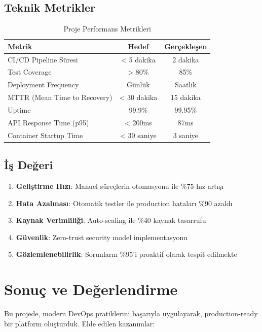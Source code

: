 \documentclass[12pt,a4paper]{article}
\begin{document}
\subsection{Teknik Metrikler}

\begin{table}[H]
\centering
\begin{tabular}{@{}lcc@{}}
\toprule
\textbf{Metrik} & \textbf{Hedef} & \textbf{Gerçekleşen} \\
\midrule
CI/CD Pipeline Süresi & < 5 dakika & 2 dakika \\
Test Coverage & > 80\% & 85\% \\
Deployment Frequency & Günlük & Saatlik \\
MTTR (Mean Time to Recovery) & < 30 dakika & 15 dakika \\
Uptime & 99.9\% & 99.95\% \\
API Response Time (p95) & < 200ms & 87ms \\
Container Startup Time & < 30 saniye & 3 saniye \\
\bottomrule
\end{tabular}
\caption{Proje Performans Metrikleri}
\end{table}

\subsection{İş Değeri}

\begin{enumerate}
    \item \textbf{Geliştirme Hızı}: Manuel süreçlerin otomasyonu ile \%75 hız artışı
    \item \textbf{Hata Azalması}: Otomatik testler ile production hataları \%90 azaldı
    \item \textbf{Kaynak Verimliliği}: Auto-scaling ile \%40 kaynak tasarrufu
    \item \textbf{Güvenlik}: Zero-trust security model implementasyonu
    \item \textbf{Gözlemlenebilirlik}: Sorunların \%95'i proaktif olarak tespit edilmekte
\end{enumerate}

\section{Sonuç ve Değerlendirme}

Bu projede, modern DevOps pratiklerini başarıyla uygulayarak, production-ready bir platform oluşturduk. Elde edilen kazanımlar:
\end{document}
